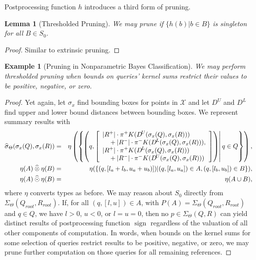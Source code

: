 \documentclass{article}
\newtheorem{lemma}{Lemma}
\newtheorem{example} {Example}
\newcommand{\GNP}[1][\psi]{{#1}_{\Theta}}
\newcommand{\sigmahat}{\mathbin{\widehat{\sigma}}}
\newcommand{\otimeshat}{\mathbin{\widehat{\otimes}}}
\newcommand{\odothat}{\mathbin{\widehat{\odot}}}
\DeclareMathOperator{\sign}{sign}
\begin{document}

Postprocessing function $h$ introduces a
third form of pruning.
\begin{lemma}[Thresholded Pruning]
  We may prune if $\{h(b) | b \in B\}$ is singleton for all $B \in
  S_0$.
\end{lemma}
\begin{proof}
  Similar to extrinsic pruning.
\end{proof}

\begin{example}[Pruning in Nonparametric Bayes Classification]
  We may perform thresholded pruning when bounds on queries' kernel
  sums restrict their values to be positive, negative, or zero.
\end{example}
\begin{proof}
  Yet again, let $\sigma_x$ find bounding boxes for points in
  $\mathcal{X}$ and let $D^{\!U}$ and $D^{\!L}$ find upper and lower
  bound distances between bounding boxes.  We represent summary
  results with
  \begin{eqnarray*}
    \GNP[\sigmahat](\sigma_x(Q),\sigma_x(R)) & = & \eta \left( \left\{ \left.\! \left( q, \left[ \begin{array}{ll}
	\lefteqn{|R^+| \cdot \pi^+ K(D^{\!U}(\sigma_x(Q),\sigma_x(R)))} \\
	& \mbox{} + |R^-| \cdot \pi^- K(D^{\!L}(\sigma_x(Q),\sigma_x(R))), \\
	\lefteqn{|R^+| \cdot \pi^+ K(D^{\!L}(\sigma_x(Q),\sigma_x(R)))} \\
	& \mbox{} + |R^-| \cdot \pi^- K(D^{\!U}(\sigma_x(Q),\sigma_x(R)))
    \end{array} \right] \right) \right| q \in Q \right\} \right) , \\
    \eta(A) \otimeshat \eta(B) & = & \eta(\{(q,[l_a + l_b,u_a + u_b)]) | (q,[l_a,u_a]) \in A, (q,[l_b,u_b]) \in B\}), \\
    \eta(A) \odothat \eta(B) & = & \eta(A \cup B),
  \end{eqnarray*}
  where $\eta$ converts types as before.  We may reason about $S_0$
  directly from $\GNP[\Sigma](Q_{root},R_{root})$.  If, for all
  $(q,[l,u]) \in A$, with $P(A) = \GNP[\Sigma](Q_{root},R_{root})$ and
  $q \in Q$, we have $l > 0$, $u < 0$, or $l = u = 0$, then no $p \in
  \GNP[\Sigma](Q,R)$ can yield distinct results of postprocessing
  function $\sign$ regardless of the valuation of all other components
  of computation.  In words, when bounds on the kernel sums for some
  selection of queries restrict results to be positive, negative, or
  zero, we may prune further computation on those queries for all
  remaining references.
\end{proof}
\end{document}
